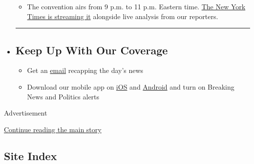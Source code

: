 \begin{itemize}
  \begin{itemize}
  \tightlist
  \item
    The convention airs from 9 p.m. to 11 p.m. Eastern time.
    \href{https://www.nytimes3xbfgragh.onion/interactive/2020/08/17/us/politics/democratic-national-convention-live-stream-analysis.html?action=click\&pgtype=Article\&state=default\&region=BELOW_MAIN_CONTENT\&context=storylines_guide}{The
    New York Times is streaming it} alongside live analysis from our
    reporters.
  \end{itemize}
\item
  \begin{center}\rule{0.5\linewidth}{\linethickness}\end{center}

  \hypertarget{keep-up-with-our-coverage}{%
  \subsection{Keep Up With Our
  Coverage}\label{keep-up-with-our-coverage}}

  \begin{itemize}
  \tightlist
  \item
    Get an
    \href{https://www.nytimes3xbfgragh.onion/newsletters/politics?action=click\&pgtype=Article\&state=default\&region=BELOW_MAIN_CONTENT\&context=storylines_guide}{email}
    recapping the day's news
  \end{itemize}

  \begin{itemize}
  \tightlist
  \item
    Download our mobile app on
    \href{https://apps.apple.com/us/app/nytimes/id284862083?ls=1\&mat_click_id=5c79ae7455014fd1bd66b5610c05b8f2-20191112-16948\&referrer=mat_click_id\%3D5c79ae7455014fd1bd66b5610c05b8f2-20191112-16948\%26link_click_id\%3D722930677036718082}{iOS}
    and
    \href{http://a.localytics.com/android?id=com.nytimes.android\&referrer=utm_source\%3Dother_nyt_mobile_web\%26utm_medium\%3DWeb\%2520page\%26utm_term\%3DGeneral\%2520Mobile\%2520Page\%26utm_campaign\%3DNYT\%2520Mobile\%2520General\%2520Page}{Android}
    and turn on Breaking News and Politics alerts
  \end{itemize}
\end{itemize}

Advertisement

\protect\hyperlink{after-bottom}{Continue reading the main story}

\hypertarget{site-index}{%
\subsection{Site Index}\label{site-index}}

